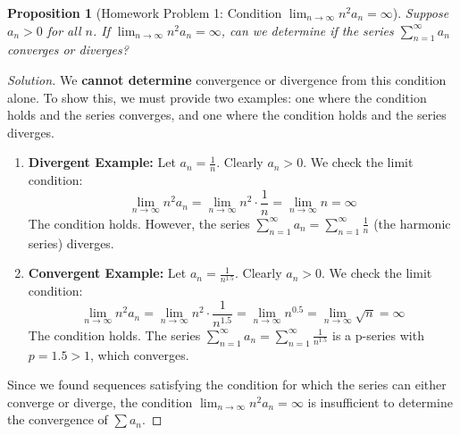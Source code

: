 \documentclass[11pt, a4paper]{article}
\theoremstyle{plain} %
\newtheorem{proposition}[theorem]{Proposition}
\theoremstyle{definition} %
\begin{document}
\begin{proposition}[Homework Problem 1: Condition $\lim_{n\to\infty} n^2 a_n = \infty$]\label{prob:lim_n2an_inf}
Suppose $a_n > 0$ for all $n$. If $\lim_{n\to\infty} n^2 a_n = \infty$, can we determine if the series $\sum_{n=1}^\infty a_n$ converges or diverges?
\end{proposition}
\begin{proof}[Solution]
We \textbf{cannot determine} convergence or divergence from this condition alone. To show this, we must provide two examples: one where the condition holds and the series converges, and one where the condition holds and the series diverges.

\begin{enumerate}
    \item \textbf{Divergent Example:} Let $a_n = \frac{1}{n}$.
        Clearly $a_n > 0$. We check the limit condition:
        $$ \lim_{n\to\infty} n^2 a_n = \lim_{n\to\infty} n^2 \cdot \frac{1}{n} = \lim_{n\to\infty} n = \infty $$
        The condition holds. However, the series $\sum_{n=1}^\infty a_n = \sum_{n=1}^\infty \frac{1}{n}$ (the harmonic series) diverges.

    \item \textbf{Convergent Example:} Let $a_n = \frac{1}{n^{1.5}}$.
        Clearly $a_n > 0$. We check the limit condition:
        $$ \lim_{n\to\infty} n^2 a_n = \lim_{n\to\infty} n^2 \cdot \frac{1}{n^{1.5}} = \lim_{n\to\infty} n^{0.5} = \lim_{n\to\infty} \sqrt{n} = \infty $$
        The condition holds. The series $\sum_{n=1}^\infty a_n = \sum_{n=1}^\infty \frac{1}{n^{1.5}}$ is a p-series with $p=1.5 > 1$, which converges.
\end{enumerate}
Since we found sequences satisfying the condition for which the series can either converge or diverge, the condition $\lim_{n\to\infty} n^2 a_n = \infty$ is insufficient to determine the convergence of $\sum a_n$.
\end{proof}
\end{document}
